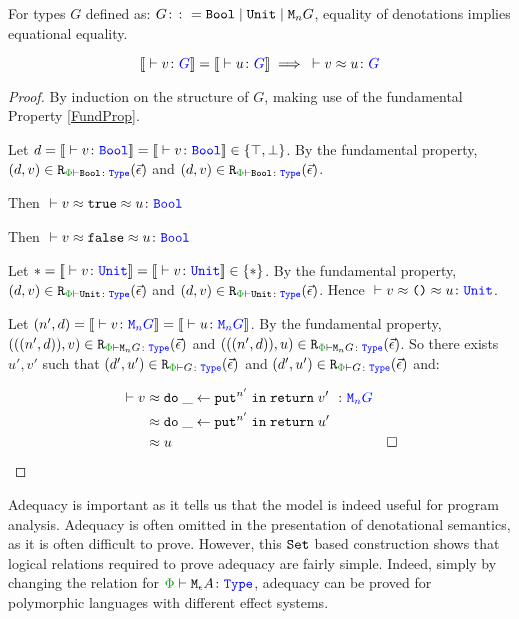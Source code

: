 \begin{framed}
    
    \begin{theorem}[Adequacy]
        For types $G$ defined as: $ G\colon\colon= \texttt{Bool} \mid \texttt{Unit} \mid \texttt{M}_{n}{G}$, equality of denotations implies equational equality.
        
        \begin{equation}
            \deno{\ztyperelation{v}{G}} = \deno{\ztyperelation{u}{G}} \implies \zberelation{v}{u}{G}
        \end{equation}
        
    \end{theorem}
        
        \begin{proof}
            By induction on the structure of $G$, making use of the fundamental Property \ref{FundProp}.
        

            Let $d=\deno{\ztyperelation{v}{\B}}=\deno{\ztyperelation{v}{\B}}\in \{ \top, \bot\}$. By the fundamental property, $\inLogRelPE{d}{v}{\B}$  and $\inLogRelPE{d}{v}{\B}$.
        
            Then $\zberelation{v\beequiv\t}{u}{\B}$
        
            
            Then $\zberelation{v\beequiv\f}{u}{\B}$
        

            Let $\singleton=\deno{\ztyperelation{v}{\U}}=\deno{\ztyperelation{v}{\U}}\in \{\singleton\}$. By the fundamental property, $\inLogRelPE{d}{v}{\U}$  and $\inLogRelPE{d}{v}{\U}$. Hence $\zberelation{v\beequiv\u}{u}{\U}$.
        
            \case{\teffect}
        
            Let $( n',  d) = \deno{\ztyperelation{v}{\M{n}{G}}} = \deno{\ztyperelation{u}{\M{n}{G}}}$. By the fundamental property, $\inLogRelPE{((n', d))}{v}{\M{n}{G}}$ and $\inLogRelPE{((n', d))}{u}{\M{n}{G}}$. So there exists $u', v'$ such that $\inLogRelPE{d'}{u'}{G}$ and $\inLogRelPE{d'}{u'}{G}$ and:
        
            \begin{align*}
                \zberelation{v&}{\doin{\_}{\put^{n'}}{\return{v'}}}{\M{n}{G}}\\
                &\beequiv \doin{\_}{\put^{n'}}{\return{u'}}\\
                & \beequiv u & \square
            \end{align*}
        \end{proof}
\end{framed}

Adequacy is important as it tells us that the model is indeed useful for program analysis. Adequacy is often omitted in the presentation of denotational semantics, as it is often difficult to prove. However, this $\texttt{Set}$ based construction shows that logical relations required to prove adequacy are fairly simple. Indeed, simply by changing the relation for $\wellformedt{\P}{\mea}$, adequacy can be proved for polymorphic languages with different effect systems.